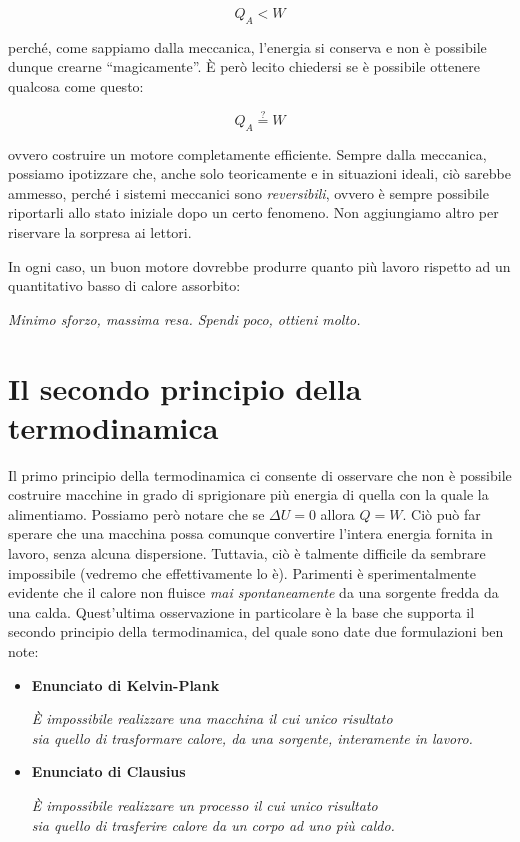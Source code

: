 \[ Q_A < W \]

\noindent perché, come sappiamo dalla meccanica, l'energia si conserva
e non è possibile dunque crearne ``magicamente''. È però lecito chiedersi
se è possibile ottenere qualcosa come questo:

\[ Q_A \stackrel{?}{=} W \]

\noindent ovvero costruire un motore completamente efficiente. Sempre
dalla meccanica, possiamo ipotizzare che, anche solo teoricamente e
in situazioni ideali, ciò sarebbe ammesso, perché i sistemi meccanici
sono \textit{reversibili}, ovvero è sempre possibile riportarli allo
stato iniziale dopo un certo fenomeno. Non aggiungiamo altro per riservare
la sorpresa ai lettori.

In ogni caso, un buon motore dovrebbe produrre quanto più lavoro rispetto
ad un quantitativo basso di calore assorbito:

\begin{center}
    \textit{Minimo sforzo, massima resa. Spendi poco, ottieni molto.}
\end{center}

\section{Il secondo principio della termodinamica}
Il primo principio della termodinamica ci consente di osservare che non
è possibile costruire macchine in grado di sprigionare più energia di
quella con la quale la alimentiamo. Possiamo però notare che se $\Delta U = 0$
allora $Q = W$. Ciò può far sperare che una macchina possa comunque
convertire l'intera energia fornita in lavoro, senza alcuna dispersione.
Tuttavia, ciò è talmente difficile da sembrare impossibile (vedremo che
effettivamente lo è). Parimenti è sperimentalmente evidente che il
calore non fluisce \textit{mai spontaneamente} da una sorgente fredda
da una calda. Quest'ultima osservazione in particolare è la base che
supporta il secondo principio della termodinamica, del quale sono date
due formulazioni ben note:

\begin{itemize}
    \item \textbf{Enunciato di Kelvin-Plank}
    
    \begin{center}
        \textit{È impossibile realizzare una macchina il cui unico risultato\\
        sia quello di trasformare calore, da una sorgente, interamente in lavoro.}
    \end{center}

    \item \textbf{Enunciato di Clausius}
    
    \begin{center}
        \textit{È impossibile realizzare un processo il cui unico risultato\\
        sia quello di trasferire calore da un corpo ad uno più caldo.}
    \end{center}
\end{itemize}


